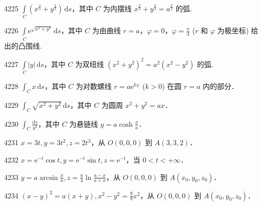 \begin{prob}[S]{4225}
$\displaystyle \int\limits_C (x^{\frac{4}{3}} + y^{\frac{4}{3}})\,\mathrm{d}s$，其中 $C$ 为内摆线 $x^{\frac{2}{3}} + y^{\frac{2}{3}} = a^{\frac{2}{3}}$ 的弧.
\end{prob}

\begin{prob}[S]{4226}
$\displaystyle \int\limits_C \mathrm{e}^{\sqrt{x^2+y^2}}\,\mathrm{d}s$，其中 $C$ 为由曲线 $r = a$，$\varphi = 0$，$\varphi = \frac{\pi}{4}$ ($r$ 和 $\varphi$ 为极坐标) 给出的凸围线.
\end{prob}

\begin{prob}[S]{4227}
$\displaystyle \int\limits_C |y|\,\mathrm{d}s$，其中 $C$ 为双纽线 $(x^2+y^2)^2 = a^2(x^2-y^2)$ 的弧.
\end{prob}

\begin{prob}[S]{4228}
$\displaystyle\int_C x\,\mathrm{d}s$，其中 $C$ 为对数螺线 $r = a\mathrm{e}^{k\varphi}$ ($k > 0$) 在圆 $r = a$ 内的部分．
\end{prob}

\begin{prob}[S]{4229}
$\displaystyle\int_C \sqrt{x^2+y^2}\,\mathrm{d}s$，其中 $C$ 为圆周 $x^2+y^2 = ax$．
\end{prob}

\begin{prob}[S]{4230}
$\displaystyle\int_C \frac{\mathrm{d}s}{y^2}$，其中 $C$ 为悬链线 $y = a\cosh\frac{x}{a}$．
\end{prob}


\begin{prob}[S]{4231}
$x = 3t, y = 3t^2, z = 2t^3$，从 $O(0,0,0)$ 到 $A(3,3,2)$．
\end{prob}

\begin{prob}[S]{4232}
$x = \mathrm{e}^{-t}\cos t, y = \mathrm{e}^{-t}\sin t, z = \mathrm{e}^{-t}$，当 $0 < t < +\infty$．
\end{prob}

\begin{prob}[S]{4233}
$y = a\arcsin\frac{x}{a}, z = \frac{a}{4}\ln\frac{a-x}{a+x}$，从 $O(0,0,0)$ 到 $A(x_0, y_0, z_0)$．
\end{prob}

\begin{prob}[S]{4234}
$(x-y)^2 = a(x+y), x^2-y^2 = \frac{9}{8}x^2$，从 $O(0,0,0)$ 到 $A(x_0, y_0, z_0)$．
\end{prob}

